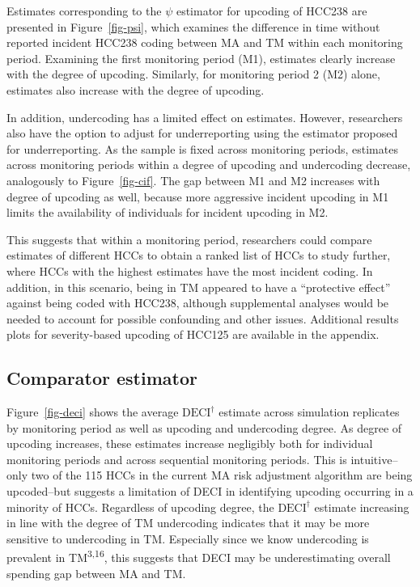 \documentclass[
  12pt,
  number]{elsarticle}
\begin{document}
Estimates corresponding to the \(\psi\) estimator for upcoding of HCC238
are presented in Figure~\ref{fig-psi}, which examines the difference in
time without reported incident HCC238 coding between MA and TM within
each monitoring period. Examining the first monitoring period (M1),
estimates clearly increase with the degree of upcoding. Similarly, for
monitoring period 2 (M2) alone, estimates also increase with the degree
of upcoding.

In addition, undercoding has a limited effect on estimates. However,
researchers also have the option to adjust for underreporting using the
estimator proposed for underreporting. As the sample is fixed across
monitoring periods, estimates across monitoring periods within a degree
of upcoding and undercoding decrease, analogously to
Figure~\ref{fig-cif}. The gap between M1 and M2 increases with degree of
upcoding as well, because more aggressive incident upcoding in M1 limits
the availability of individuals for incident upcoding in M2.

This suggests that within a monitoring period, researchers could compare
estimates of different HCCs to obtain a ranked list of HCCs to study
further, where HCCs with the highest estimates have the most incident
coding. In addition, in this scenario, being in TM appeared to have a
``protective effect'' against being coded with HCC238, although
supplemental analyses would be needed to account for possible
confounding and other issues. Additional results plots for
severity-based upcoding of HCC125 are available in the appendix.

\subsection{Comparator estimator}\label{comparator-estimator}

Figure~\ref{fig-deci} shows the average \(\text{DECI}^\dagger\) estimate
across simulation replicates by monitoring period as well as upcoding
and undercoding degree. As degree of upcoding increases, these estimates
increase negligibly both for individual monitoring periods and across
sequential monitoring periods. This is intuitive--only two of the 115
HCCs in the current MA risk adjustment algorithm are being upcoded--but
suggests a limitation of DECI in identifying upcoding occurring in a
minority of HCCs. Regardless of upcoding degree, the
\(\text{DECI}^\dagger\) estimate increasing in line with the degree of
TM undercoding indicates that it may be more sensitive to undercoding in
TM. Especially since we know undercoding is prevalent in
TM\textsuperscript{3,16}, this suggests that DECI may be underestimating
overall spending gap between MA and TM.
\end{document}
